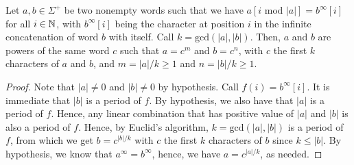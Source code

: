 \begin{lemma}\label{lem:word-theory}
    Let $a,b \in \Sigma^+$ be two nonempty words such that we have $a[i \text{ mod } |a|] = b^\infty [i]$ for all $i\in\mathbb{N}$, with $b^\infty [i]$ being the character at position $i$ in the infinite concatenation of word $b$ with itself. Call $k=\text{gcd}(|a|,|b|)$. Then, $a$ and $b$ are powers of the same word $c$ such that $a = c^m$ and $b = c^n$, with $c$ the first $k$ characters of $a$ and $b$, and $m = |a|/k \geq 1$ and $n = |b|/k \geq 1$.
\end{lemma}
\begin{proof}
    Note that $|a| \neq 0$ and $|b| \neq 0$ by hypothesis. Call $f(i) = b^\infty[i]$. It is immediate that $|b|$ is a period of $f$. By hypothesis, we also have that $|a|$ is a period of $f$. Hence, any linear combination that has positive value of $|a|$ and $|b|$ is also a period of $f$. Hence, by Euclid's algorithm, $k=\text{gcd}(|a|,|b|)$ is a period of $f$, from which we get $b = c^{|b|/k}$ with $c$ the first $k$ characters of $b$ since $k \leq |b|$. By hypothesis, we know that $a^{\infty} = b^{\infty}$, hence, we have $a = c^{|a|/k}$, as needed.


\end{proof}

